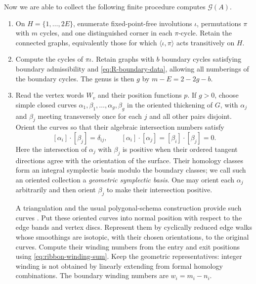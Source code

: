 \documentclass[11pt]{amsart}
\theoremstyle{definition}
\theoremstyle{plain}
\theoremstyle{definition}
\theoremstyle{definition}
\newcommand{\GSpec}{\mathcal G}
\begin{document}
Now we are able to collect the following finite procedure computes $\GSpec(A)$.
\begin{enumerate}[label=\textup{(\arabic*)},leftmargin=2.6em]
\item
On $H=\{1,\ldots,2E\}$, enumerate fixed-point-free involutions
$\iota$, permutations $\pi$ with $m$ cycles, and one distinguished
corner in each $\pi$-cycle.  Retain the connected graphs,
equivalently those for which $\langle\iota,\pi\rangle$ acts
transitively on $H$.

\item
Compute the cycles of $\pi\iota$.  Retain graphs with $b$ boundary
cycles satisfying boundary admissibility and
\eqref{eq:R-boundary-data}, allowing all numberings of the boundary
cycles.  The genus is then $g$ by $m-E=2-2g-b$.

\item
Read the vertex words $W_v$ and their position functions $p$.
If $g>0$, choose simple closed curves
$\alpha_1,\beta_1,\ldots,\alpha_g,\beta_g$
in the oriented thickening of $G$, with $\alpha_j$ and $\beta_j$
meeting transversely once for each $j$ and all other pairs
disjoint.  Orient the curves so that their algebraic intersection
numbers satisfy
\[
  [\alpha_i]\cdot[\beta_j]=\delta_{ij},
  \qquad
  [\alpha_i]\cdot[\alpha_j]
  =
  [\beta_i]\cdot[\beta_j]=0.
\]
Here the intersection of $\alpha_j$ with $\beta_j$ is positive
when their ordered tangent directions agree with the orientation
of the surface.  Their homology classes form an integral
symplectic basis modulo the boundary classes; we call such an
oriented collection a \emph{geometric symplectic basis}.
One may orient each $\alpha_j$ arbitrarily and then orient
$\beta_j$ to make their intersection positive.

A triangulation and the usual polygonal-schema construction
provide such curves \cite{GrossTucker}.  Put these oriented curves into normal position with respect
to the edge bands and vertex discs. Represent them by
cyclically reduced edge walks whose smoothings are isotopic,
with their chosen orientations, to the original curves.
Compute their winding numbers from the entry and exit
positions using \eqref{eq:ribbon-winding-sum}.
Keep the geometric representatives: integer winding is not
obtained by linearly extending from formal homology combinations.
The boundary winding numbers are $w_i=m_i-n_i$.


\end{enumerate}
\end{document}
